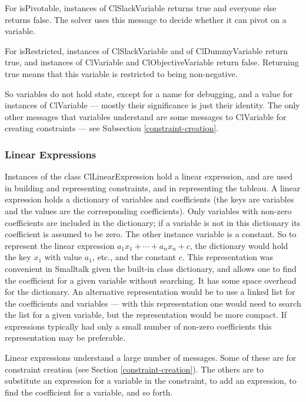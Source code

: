 \documentclass{article}
\begin{document}
For {\sf isPivotable}, instances of {\sf ClSlackVariable} returns true
and everyone else returns false.  The solver uses this message to decide
whether it can pivot on a variable.

For {\sf isRestricted}, instances of {\sf ClSlackVariable} and
of {\sf ClDummyVariable} return true, and instances of
{\sf ClVariable} and {\sf ClObjectiveVariable} return false.  Returning
true means that this variable is restricted to being non-negative.


So variables do not hold state, except for a name for debugging, and a value
for instances of {\sf ClVariable} --- mostly their significance is just
their identity.  The only other messages that variables understand are some
messages to {\sf ClVariable} for creating constraints --- see Subsection
\ref{constraint-creation}.

\subsubsection{Linear Expressions}

Instances of the class {\sf ClLinearExpression} hold a linear expression,
and are used in building and representing
constraints, and in representing the tableau.  A linear expression holds a
dictionary of variables and coefficients (the keys are variables and the
values are the corresponding coefficients).  Only variables
with non-zero coefficients are included in the dictionary; 
if a variable is not in this
dictionary its coefficient is assumed to be zero.  The other instance
variable is a constant.  So to represent the linear expression 
$a_1 x_1 + \cdots + a_n x_n + c$, the dictionary would hold the key $x_1$
with value $a_1$, etc., and the constant $c$.  This representation was
convenient in Smalltalk given the built-in class dictionary, and allows one
to find the coefficient for a given variable without searching.  It has
some space overhead for the dictionary.  An alternative representation
would be to use a linked list for the coefficients and variables --- with
this representation one would need to search the list for a given variable,
but the representation would be more compact.  If expressions typically had
only a small number of non-zero coefficients this representation may be
preferable.

Linear expressions understand  a large number of messages.  Some of these
are for constraint creation (see Section \ref{constraint-creation}).  The
others are to substitute an expression for a variable in the constraint, to
add an expression, to find the coefficient for a variable, and so forth.
\end{document}
